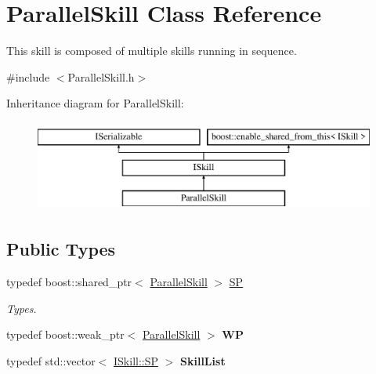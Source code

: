 \hypertarget{class_parallel_skill}{}\section{Parallel\+Skill Class Reference}
\label{class_parallel_skill}


This skill is composed of multiple skills running in sequence.  




{\ttfamily \#include $<$Parallel\+Skill.\+h$>$}

Inheritance diagram for Parallel\+Skill\+:\begin{figure}[H]
\begin{center}
\leavevmode
\includegraphics[height=3.000000cm]{class_parallel_skill}
\end{center}
\end{figure}
\subsection*{Public Types}
\begin{DoxyCompactItemize}
\item 
\mbox{\label{class_parallel_skill_abfbba287cbffa2c09cb0ed35b744a84b}} 
typedef boost\+::shared\+\_\+ptr$<$ \hyperlink{class_parallel_skill}{Parallel\+Skill} $>$ \hyperlink{class_parallel_skill_abfbba287cbffa2c09cb0ed35b744a84b}{SP}
\begin{DoxyCompactList}\small\item\em Types. \end{DoxyCompactList}\item 
\mbox{\label{class_parallel_skill_a132693de85c38f466f4b859d774b1eb0}} 
typedef boost\+::weak\+\_\+ptr$<$ \hyperlink{class_parallel_skill}{Parallel\+Skill} $>$ {\bfseries WP}
\item 
\mbox{\label{class_parallel_skill_a2a5d4de4e904d3ece62997362d55ab80}} 
typedef std\+::vector$<$ \hyperlink{class_i_skill_a68bcce999ab0444eebaca3fb8ddb8a31}{I\+Skill\+::\+SP} $>$ {\bfseries Skill\+List}
\end{DoxyCompactItemize}
